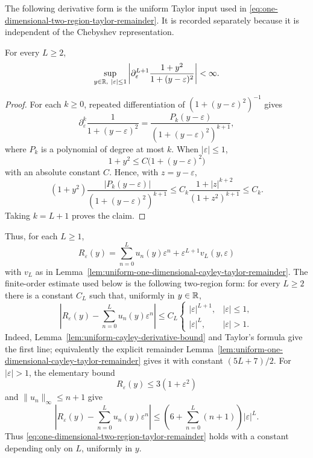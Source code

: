 The following derivative form is the uniform Taylor input used in
\eqref{eq:one-dimensional-two-region-taylor-remainder}.  It is recorded
separately because it is independent of the Chebyshev representation.

\begin{lemma}%
\label{lem:uniform-cayley-derivative-bound}
For every \(L\ge2\),
\[
\sup_{y\in\mathbb{R},\ |\varepsilon|\le1}
\left|
\partial_\varepsilon^{L+1}
\frac{1+y^2}{1+(y-\varepsilon)^2}
\right|<\infty .
\]
\end{lemma}

\ifdefined\JFAArticleMain
{}
\else
\begin{proof}
For each \(k\ge0\), repeated differentiation of
\((1+(y-\varepsilon)^2)^{-1}\) gives
\[
\partial_\varepsilon^k
\frac{1}{1+(y-\varepsilon)^2}
=
\frac{P_k(y-\varepsilon)}
{(1+(y-\varepsilon)^2)^{k+1}},
\]
where \(P_k\) is a polynomial of degree at most \(k\).  When
\(|\varepsilon|\le1\),
\[
1+y^2\le C\bigl(1+(y-\varepsilon)^2\bigr)
\]
with an absolute constant \(C\).  Hence, with \(z=y-\varepsilon\),
\[
(1+y^2)
\frac{|P_k(y-\varepsilon)|}{(1+(y-\varepsilon)^2)^{k+1}}
\le
C_k\frac{1+|z|^{k+2}}{(1+z^2)^{k+1}}
\le C_k .
\]
Taking \(k=L+1\) proves the claim.
\end{proof}
\fi

Thus, for each \(L\ge1\),
\[
R_\varepsilon(y)=\sum_{n=0}^{L}u_n(y)\varepsilon^n
 +\varepsilon^{L+1}v_L(y,\varepsilon)
\]
with \(v_L\) as in
Lemma~\ref{lem:uniform-one-dimensional-cayley-taylor-remainder}.  The
finite-order estimate used below is the
following two-region form: for every \(L\ge2\) there is a constant \(C_L\)
such that, uniformly in \(y\in\mathbb{R}\),
\begin{equation}\label{eq:one-dimensional-two-region-taylor-remainder}
\left|R_\varepsilon(y)-\sum_{n=0}^{L}u_n(y)\varepsilon^n\right|
\le C_L
\begin{cases}
|\varepsilon|^{L+1},& |\varepsilon|\le1,\\
|\varepsilon|^L,& |\varepsilon|>1.
\end{cases}
\end{equation}
Indeed, Lemma~\ref{lem:uniform-cayley-derivative-bound} and Taylor's formula
give the first line; equivalently the explicit remainder
Lemma~\ref{lem:uniform-one-dimensional-cayley-taylor-remainder}
gives it with constant \((5L+7)/2\).  For
\(|\varepsilon|>1\), the elementary bound
\[
R_\varepsilon(y)\le3(1+\varepsilon^2)
\]
and \(\|u_n\|_\infty\le n+1\) give
\[
\left|R_\varepsilon(y)-\sum_{n=0}^{L}u_n(y)\varepsilon^n\right|
\le
\left(6+\sum_{n=0}^{L}(n+1)\right)|\varepsilon|^L .
\]
Thus \eqref{eq:one-dimensional-two-region-taylor-remainder} holds with a
constant depending only on \(L\), uniformly in \(y\).

